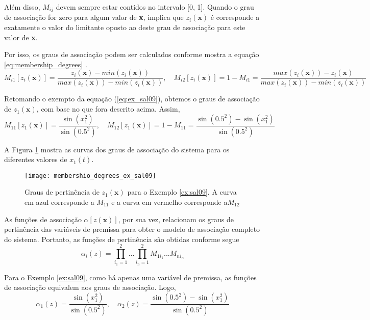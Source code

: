 Além disso, $M_{ij}$ devem sempre estar contidos no intervalo [0, 1]. Quando o grau de associação for zero para algum valor de \textbf{x}, implica que $z_i(\textbf{x})$ é corresponde a exatamente o valor do limitante oposto ao deste grau de associação para este valor de \textbf{x}.

Por isso, os graus de associação podem ser calculados conforme mostra a equação \ref{eq:membership_degrees} \cite{booktw:2003}.
\begin{equation}\label{eq:membership_degrees}
M_{i1}[z_i(\textbf{x})] =\dfrac{z_i(\textbf{x})-min(z_i(\textbf{x}))}{max(z_i(\textbf{x}))-min(z_i(\textbf{x}))}, \quad M_{i2}[z_i(\textbf{x})] = 1 - M_{i1} =\dfrac{max(z_i(\textbf{x}))-z_i(\textbf{x})}{max(z_i(\textbf{x}))-min(z_i(\textbf{x}))} 
\end{equation}

Retomando o exempto da equação (\ref{eq:ex_sal09}), obtemos o graus de associação de $z_1(\textbf{x})$, com base no que fora descrito acima. Assim,
\begin{equation}\label{eq:membership_degrees_ex_sal09}
M_{11}[z_1(\textbf{x})] =\dfrac{\sin(x_1^2)}{\sin(0.5^2)}, \quad M_{12}[z_1(\textbf{x})] = 1 - M_{11} =\dfrac{\sin(0.5^2) - \sin(x_1^2)}{\sin(0.5^2)}
\end{equation}

A Figura \ref{fig:setor_local_ex_sal09} mostra as curvas dos graus de associação do sistema para os diferentes valores de $x_1(t)$.

\begin{figure}[htbp]
	\centering
	\texttt{[image: membershio\_degrees\_ex\_sal09]}
	\caption{Graus de pertinência de $z_1(\textbf{x})$ para o Exemplo \ref{ex:sal09}. A curva em azul corresponde a $M_{11}$ e a curva em vermelho corresponde a$M_{12}$}
	 \label{fig:setor_local_ex_sal09}
\end{figure}

As funções de associação ${\alpha[z(\textbf{x})]}$, por sua vez, relacionam os graus de pertinência das variáveis de premissa para obter o modelo de associação completo do sistema. Portanto, as funções de pertinência são obtidas conforme segue
\begin{equation}\label{eq:membership_functions}
\alpha_i (z)=\prod_{i_1 = 1}^{2} ... \prod_{i_n = 1}^{2} M_{1i_1}... M_{ni_n}
\end{equation}

Para o Exemplo \ref{ex:sal09}, como há apenas uma variável de premissa, as funções de associação equivalem aos graus de associação. Logo,
\begin{equation}\label{eq:membership_functions_ex_sal09}
\alpha_1(z) = \dfrac{\sin(x_1^2)}{\sin(0.5^2)}, \quad \alpha_2(z) = \dfrac{\sin(0.5^2) - \sin(x_1^2)}{\sin(0.5^2)}
\end{equation}

